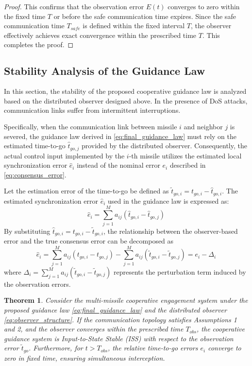 \documentclass[lettersize,journal]{IEEEtran}
\newtheorem{theorem}{Theorem}
\newtheorem{proof}{Proof}
\begin{document}
\begin{proof}
This confirms that the observation error $E(t)$ converges to zero within the fixed time $T$ or before the safe communication time expires. Since the safe communication time $T_{safe}$ is defined within the fixed interval $T$, the observer effectively achieves exact convergence within the prescribed time $T$. This completes the proof.
\end{proof}

\subsection{Stability Analysis of the Guidance Law}
In this section, the stability of the proposed cooperative guidance law is analyzed based on the distributed observer designed above. In the presence of DoS attacks, communication links suffer from intermittent interruptions.
 
Specifically, when the communication link between missile $i$ and neighbor $j$ is severed, the guidance law derived in \eqref{eq:final_guidance_law} must rely on the estimated time-to-go $\hat{t}_{go,j}$ provided by the distributed observer. Consequently, the actual control input implemented by the $i$-th missile utilizes the estimated local synchronization error $\hat{e}_i$ instead of the nominal error $e_i$ described in \eqref{eq:consensus_error}. 

Let the estimation error of the time-to-go be defined as $\tilde{t}_{go,i} = t_{go,i} - \hat{t}_{go,i}$. The estimated synchronization error $\hat{e}_i$ used in the guidance law is expressed as:
\begin{equation}
	\label{eq:estimated_error}\hat{e}_i = \sum_{j=1}^{M} a_{ij} (\hat{t}_{go,i} - \hat{t}_{go,j})
\end{equation}
By substituting $\hat{t}_{go,i} = t_{go,i} - \tilde{t}_{go,i}$, the relationship between the observer-based error and the true consensus error can be decomposed as
\begin{equation}
	\label{eq:error_decomposition}
	\hat{e}_i = \sum_{j=1}^{M} a_{ij} (t_{go,i} - t_{go,j}) - \sum_{j=1}^{M} a_{ij} (\tilde{t}_{go,i} - \tilde{t}_{go,j}) = e_i - \Delta_i
\end{equation}
where $\Delta_i = \sum_{j=1}^{M} a_{ij} (\tilde{t}_{go,i} - \tilde{t}_{go,j})$ represents the perturbation term induced by the observation errors.
\begin{theorem}
Consider the multi-missile cooperative engagement system under the proposed guidance law \eqref{eq:final_guidance_law} and the distributed observer \eqref{eq:observer_structure}. If the communication topology satisfies Assumptions 1 and 2, and the observer converges within the prescribed time $T_{obs}$, the cooperative guidance system is Input-to-State Stable (ISS) with respect to the observation error $\tilde{t}_{go}$. Furthermore, for $t > T_{obs}$, the relative time-to-go errors $e_i$ converge to zero in fixed time, ensuring simultaneous interception.
\end{theorem}
\end{document}
